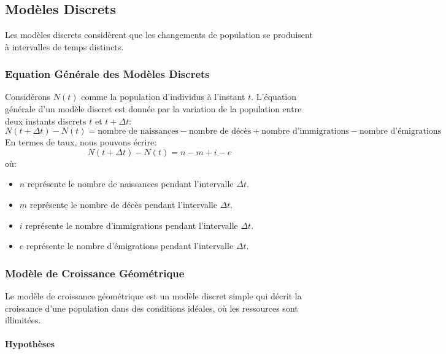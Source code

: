\documentclass[oneside]{book}
\begin{document}
\sloppy
\chapter{}
\sloppy

\section{Modèles Discrets}

Les modèles discrets considèrent que les changements de population se produisent à intervalles de temps distincts.

\subsection{Equation Générale des Modèles Discrets}

Considérons $N(t)$ comme la population d'individus à l'instant $t$. L'équation générale d'un modèle discret est donnée par la variation de la population entre deux instants discrets $t$ et $t + \Delta t$:
\[
N(t + \Delta t) - N(t) = \text{nombre de naissances} - \text{nombre de décès} + \text{nombre d'immigrations} - \text{nombre d'émigrations}
\]
En termes de taux, nous pouvons écrire:
\[
N(t + \Delta t) - N(t) = n - m + i - e
\]
où:
\begin{itemize}
    \item $n$ représente le nombre de naissances pendant l'intervalle $\Delta t$.
    \item $m$ représente le nombre de décès pendant l'intervalle $\Delta t$.
    \item $i$ représente le nombre d'immigrations pendant l'intervalle $\Delta t$.
    \item $e$ représente le nombre d'émigrations pendant l'intervalle $\Delta t$.
\end{itemize}

\subsection{Modèle de Croissance Géométrique}

Le modèle de croissance géométrique est un modèle discret simple qui décrit la croissance d'une population dans des conditions idéales, où les ressources sont illimitées.

\subsubsection{Hypothèses}
\end{document}
